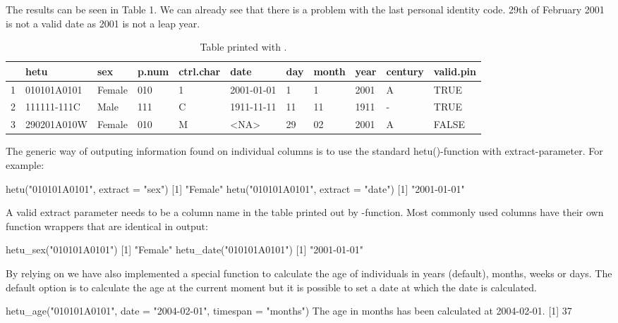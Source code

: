 The results can be seen in Table 1. We can already see that there is a problem with the last personal identity code. 29th of February 2001 is not a valid date as 2001 is not a leap year.

\begin{table}[ht]
\centering
\begin{tabular}{rllllllllll}
\toprule
    & hetu & sex & p.num & ctrl.char & date & day & month & year & century & valid.pin \\ 
  \hline
  1 & 010101A0101 & Female & 010 & 1 & 2001-01-01 & 1 & 1 & 2001 & A & TRUE \\ 
  2 & 111111-111C & Male & 111 & C &  1911-11-11 & 11 & 11 & 1911 & - & TRUE \\
  3 & 290201A010W & Female & 010 & M & <NA> & 29 & 02 & 2001 & A & FALSE \\
\bottomrule   
\end{tabular}
\caption{Table printed with .}
\label{tab:hetuprintout}
\end{table}

The generic way of outputing information found on individual columns is to use the standard hetu()-function with extract-parameter. For example:

\begin{example}
  hetu("010101A0101", extract = "sex")
  [1] "Female"
  hetu("010101A0101", extract = "date")
  [1] "2001-01-01"
\end{example}

A valid extract parameter needs to be a column name in the table printed out by -function. Most commonly used columns have their own function wrappers that are identical in output:

\begin{example}
  hetu_sex("010101A0101")
  [1] "Female"
  hetu_date("010101A0101")
  [1] "2001-01-01"
\end{example}

By relying on  we have also implemented a special function to calculate the age of individuals in years (default), months, weeks or days. The default option is to calculate the age at the current moment but it is possible to set a date at which the date is calculated.

\begin{example}
  hetu_age("010101A0101", date = "2004-02-01", timespan = "months")
  The age in months has been calculated at 2004-02-01.
  [1] 37
\end{example}

